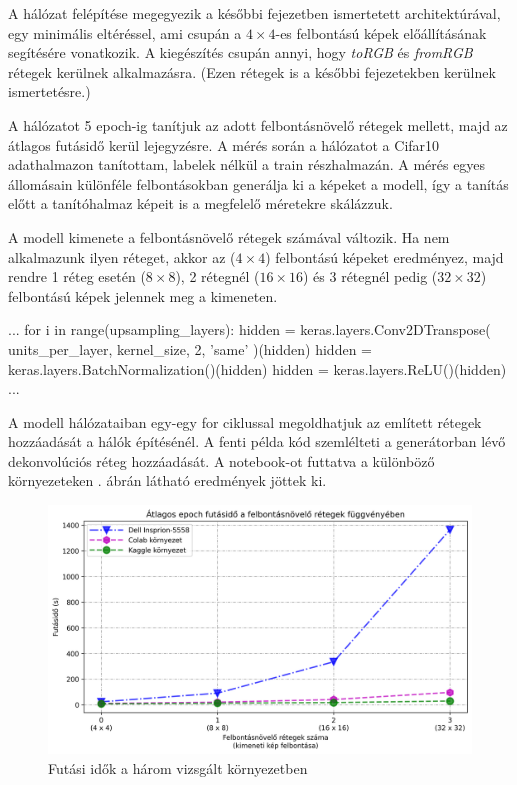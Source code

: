 A hálózat felépítése megegyezik a későbbi fejezetben ismertetett architektúrával, egy minimális eltéréssel, ami csupán a $4 \times 4$-es felbontású képek előállításának segítésére vonatkozik. A kiegészítés csupán annyi, hogy \textit{toRGB} és \textit{fromRGB} rétegek kerülnek alkalmazásra. (Ezen rétegek is a későbbi fejezetekben kerülnek ismertetésre.)

A hálózatot 5 epoch-ig tanítjuk az adott felbontásnövelő rétegek mellett, majd az átlagos futásidő kerül lejegyzésre.
A mérés során a hálózatot a Cifar10 \cite{krizhevsky2009learning} adathalmazon tanítottam, labelek nélkül a train részhalmazán.
A mérés egyes állomásain különféle felbontásokban generálja ki a képeket a modell, így a tanítás előtt a tanítóhalmaz képeit is a megfelelő méretekre skálázzuk.

A modell kimenete a felbontásnövelő rétegek számával változik. Ha nem alkalmazunk ilyen réteget, akkor az ($4 \times 4$) felbontású képeket eredményez, majd rendre 1 réteg esetén ($8 \times 8$), 2 rétegnél ($16 \times 16$) és 3 rétegnél pedig ($32 \times 32$) felbontású képek jelennek meg a kimeneten.

\begin{python}
...
for i in range(upsampling_layers):
    hidden = keras.layers.Conv2DTranspose(
        units_per_layer, kernel_size, 2, 'same'
    )(hidden)
    hidden = keras.layers.BatchNormalization()(hidden)
    hidden = keras.layers.ReLU()(hidden)
...
\end{python}

A modell hálózataiban egy-egy for ciklussal megoldhatjuk az említett rétegek hozzáadását a hálók építésénél. A fenti példa kód szemlélteti a generátorban lévő dekonvolúciós réteg hozzáadását.
A notebook-ot futtatva a különböző környezeteken . ábrán látható eredmények jöttek ki.

\begin{figure}[h]
\centering
\includegraphics[width=15cm]{images/runtime.png}
\caption{Futási idők a három vizsgált környezetben}
\label{fig:runtime}
\end{figure}

